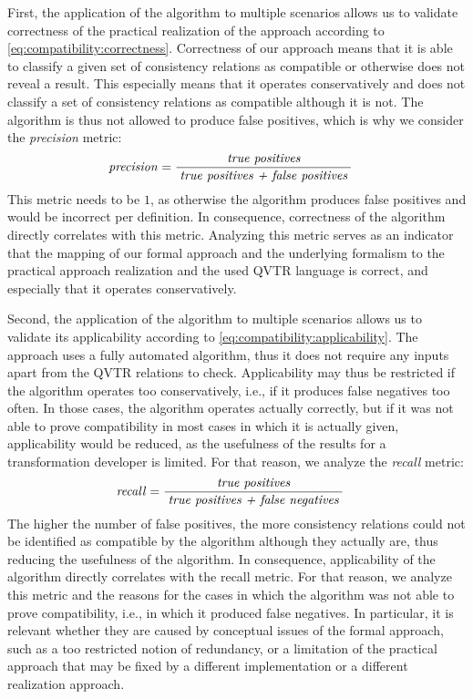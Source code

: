 First, the application of the algorithm to multiple scenarios allows us to validate correctness of the practical realization of the approach according to \autoref{eq:compatibility:correctness}.
Correctness of our approach means that it is able to classify a given set of consistency relations as compatible or otherwise does not reveal a result.
This especially means that it operates conservatively and does not classify a set of consistency relations as compatible although it is not.
The algorithm is thus not allowed to produce false positives, which is why we consider the \emph{precision} metric:
\begin{align*}
    &
    \mathit{precision} = \frac{\; \textit{true positives} \;}{\; \textit{true positives + false positives} \;}
\end{align*}
This metric needs to be $1$, as otherwise the algorithm produces false positives and would be incorrect per definition.
In consequence, correctness of the algorithm directly correlates with this metric.
Analyzing this metric serves as an indicator that the mapping of our formal approach and the underlying formalism to the practical approach realization and the used \gls{QVTR} language is correct, and especially that it operates conservatively.

Second, the application of the algorithm to multiple scenarios allows us to validate its applicability according to \autoref{eq:compatibility:applicability}.
The approach uses a fully automated algorithm, thus it does not require any inputs apart from the \gls{QVTR} relations to check.
Applicability may thus be restricted if the algorithm operates too conservatively, i.e., if it produces false negatives too often.
In those cases, the algorithm operates actually correctly, but if it was not able to prove compatibility in most cases in which it is actually given, applicability would be reduced, as the usefulness of the results for a transformation developer is limited.
For that reason, we analyze the \emph{recall} metric:
\begin{align*}
    &
    \mathit{recall} = \frac{\; \textit{true positives} \;}{\; \textit{true positives + false negatives} \;}
\end{align*}
The higher the number of false positives, the more consistency relations could not be identified as compatible by the algorithm although they actually are, thus reducing the usefulness of the algorithm.
In consequence, applicability of the algorithm directly correlates with the recall metric.
For that reason, we analyze this metric and the reasons for the cases in which the algorithm was not able to 
prove compatibility, i.e., in which it produced false negatives.
In particular, it is relevant whether they are caused by conceptual issues of the formal approach, such as a too restricted notion of redundancy, or a limitation of the practical approach that may be fixed by a different implementation or a different realization approach.


